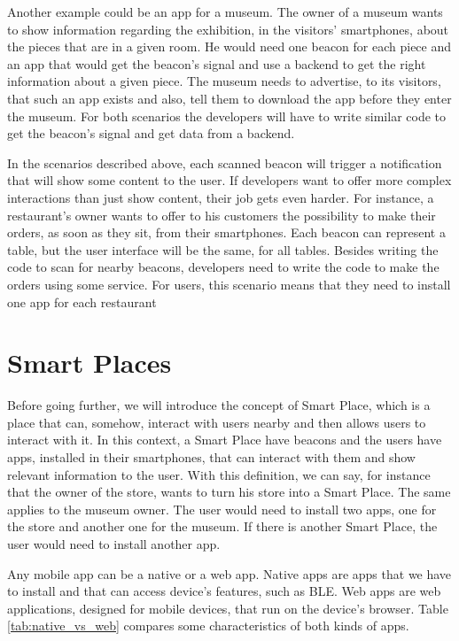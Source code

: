 Another example could be an app for a museum. The owner
of a museum wants to show information regarding the
exhibition, in the
visitors' smartphones, about the pieces that are in a given
room. He would need one beacon for each piece and an app
that would get the beacon's signal and use a
backend to get the right information about a given piece.
The museum needs to advertise, to its visitors, that such
an app exists and also, tell them to download the app
before they enter the museum. For both scenarios the developers will have to write similar code to get
the beacon's signal and get data from a backend.

In the scenarios described above, each scanned beacon
will trigger a notification that will show
some content to the user. If developers want to
offer more complex interactions than just show
content, their job gets even harder.
For instance, a restaurant's owner wants to
offer to his customers the possibility to make
their orders, as soon as they sit, from their
smartphones. Each beacon can represent a table,
but the user interface will be the same, for all
tables. Besides writing the code to scan for nearby
beacons, developers need to write the code to make
the orders using some service.
For users, this scenario means that they need
to install one app for each restaurant

\section{Smart Places}
\label{sub:smart_places}
Before going further, we will introduce the concept of
Smart Place, which is a place that can, somehow,
interact with users nearby and then allows
users to interact
with it.
In this context, a Smart Place have beacons and the users
have apps, installed in their smartphones,
that can interact
with them and show relevant information to the user.
With this definition, we can say, for instance
that the owner of the store, wants to
turn his store into a Smart Place.
The same applies to the museum owner.
The user would need to install two apps, one for the
store and another one for the museum.
If there is another Smart Place, the user would need to
install another app.

Any mobile app can be a native or a web app. Native apps
are apps that we have to install and that can access
device's features, such as BLE. Web apps are web
applications, designed for mobile devices, that run
on the device's browser. Table \ref{tab:native_vs_web}
compares some characteristics of both kinds of apps.


